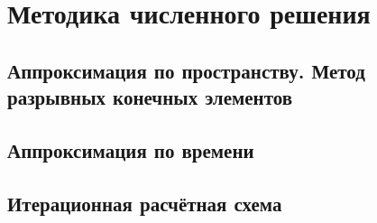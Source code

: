 \section{Методика численного решения}
\subsection{Аппроксимация по пространству. Метод разрывных конечных элементов}
\subsection{Аппроксимация по времени}
\subsection{Итерационная расчётная схема}
